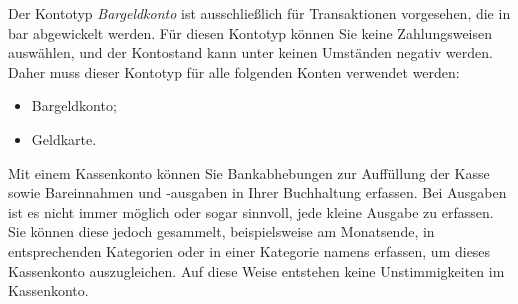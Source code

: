 Der Kontotyp \emph{Bargeldkonto} ist ausschließlich für Transaktionen vorgesehen, die in bar abgewickelt werden. Für diesen Kontotyp können Sie keine Zahlungsweisen auswählen, und der Kontostand kann unter keinen Umständen negativ werden. Daher muss dieser Kontotyp für alle folgenden Konten verwendet werden:
\begin{itemize}
	\item Bargeldkonto;
	\item Geldkarte.
\end{itemize}
Mit einem Kassenkonto können Sie Bankabhebungen zur Auffüllung der Kasse sowie Bareinnahmen und -ausgaben in Ihrer Buchhaltung erfassen. Bei Ausgaben ist es nicht immer möglich oder sogar sinnvoll, jede kleine Ausgabe zu erfassen. Sie können diese jedoch gesammelt, beispielsweise am Monatsende, in entsprechenden Kategorien oder in einer Kategorie namens  erfassen, um dieses Kassenkonto auszugleichen. Auf diese Weise entstehen keine Unstimmigkeiten im Kassenkonto.

